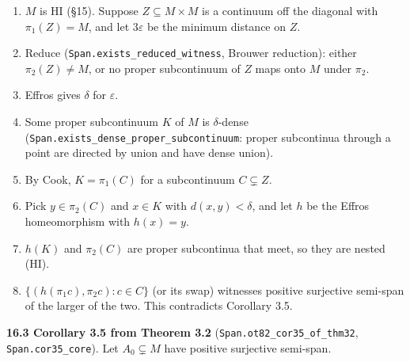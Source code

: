 \documentclass[11pt]{article}
\newcommand{\lean}[1]{\texttt{#1}}
\begin{document}
\begin{enumerate}
  \item[1.] $M$ is HI (\S{}15). Suppose $Z \subseteq M \times M$ is a continuum off the diagonal with $\pi_1(Z) = M$, and let $3\varepsilon$ be the minimum distance on $Z$.
  \item[2.] Reduce (\lean{Span.\hspace{0pt}exists\_\hspace{0pt}reduced\_\hspace{0pt}witness}, Brouwer reduction): either $\pi_2(Z) \neq M$, or no proper subcontinuum of $Z$ maps onto $M$ under $\pi_2$.
  \item[3.] Effros gives $\delta$ for $\varepsilon$.
  \item[4.] Some proper subcontinuum $K$ of $M$ is $\delta$-dense (\lean{Span.\hspace{0pt}exists\_\hspace{0pt}dense\_\hspace{0pt}proper\_\hspace{0pt}subcontinuum}: proper subcontinua through a point are directed by union and have dense union).
  \item[5.] By Cook, $K = \pi_1(C)$ for a subcontinuum $C \subsetneq Z$.
  \item[6.] Pick $y \in \pi_2(C)$ and $x \in K$ with $d(x, y) < \delta$, and let $h$ be the Effros homeomorphism with $h(x) = y$.
  \item[7.] $h(K)$ and $\pi_2(C)$ are proper subcontinua that meet, so they are nested (HI).
  \item[8.] $\{(h(\pi_1c), \pi_2c) : c \in C\}$ (or its swap) witnesses positive surjective semi-span of the larger of the two. This contradicts Corollary 3.5.
\end{enumerate}

\textbf{16.3 Corollary 3.5 from Theorem 3.2} (\lean{Span.\hspace{0pt}ot82\_\hspace{0pt}cor35\_\hspace{0pt}of\_\hspace{0pt}thm32}, \lean{Span.\hspace{0pt}cor35\_\hspace{0pt}core}). Let $A_0 \subsetneq M$ have positive surjective semi-span.
\end{document}

